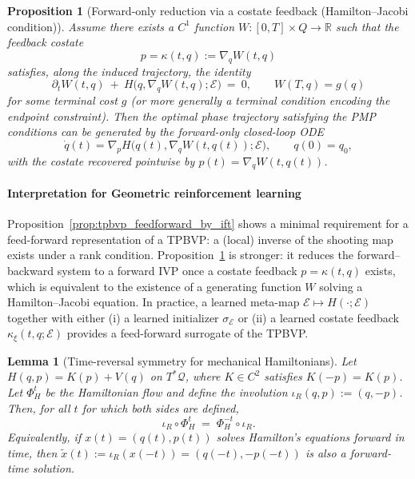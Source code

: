 \documentclass{article} %
\newtheorem{lemma}[theorem]{Lemma}         %
\newtheorem{proposition}[theorem]{Proposition}
\begin{document}
\begin{proposition}[Forward-only reduction via a costate feedback (Hamilton--Jacobi condition)]
\label{prop:tpbvp_forward_only_hj}
Assume there exists a $C^1$ function $W:[0,T]\times Q\to\mathbb R$ such that the \emph{feedback costate}
\[
p=\kappa(t,q):=\nabla_q W(t,q)
\]
satisfies, along the induced trajectory, the identity
\begin{equation}
\label{eq:hj_identity}
\partial_t W(t,q)\ +\ H\big(q,\nabla_q W(t,q);\mathcal E\big)\ =\ 0,
\qquad
W(T,q)=g(q)
\end{equation}
for some terminal cost $g$ (or more generally a terminal condition encoding the endpoint constraint).
Then the optimal phase trajectory satisfying the PMP conditions can be generated by the \emph{forward-only} closed-loop ODE
\[
\dot q(t)=\nabla_p H\big(q(t),\nabla_q W(t,q(t));\mathcal E\big),\qquad q(0)=q_0,
\]
with the costate recovered pointwise by $p(t)=\nabla_q W(t,q(t))$.
\end{proposition}

\paragraph{ Interpretation for Geometric reinforcement learning}
Proposition~\ref{prop:tpbvp_feedforward_by_ift} shows a minimal requirement for a feed-forward representation of a TPBVP:
a (local) inverse of the shooting map exists under a rank condition.
Proposition~\ref{prop:tpbvp_forward_only_hj} is stronger: it reduces the forward--backward system to a forward IVP once a costate
feedback $p=\kappa(t,q)$ exists, which is equivalent to the existence of a generating function $W$ solving a Hamilton--Jacobi equation.
In practice, a learned meta-map $\mathcal E\mapsto H(\cdot;\mathcal E)$ together with either (i) a learned initializer
$\sigma_{\mathcal E}$ or (ii) a learned costate feedback $\kappa_\xi(t,q;\mathcal E)$ provides a feed-forward surrogate of the TPBVP.

\begin{lemma}[Time-reversal symmetry for mechanical Hamiltonians]
\label{lem:mech_time_reversal}
Let $H(q,p)=K(p)+V(q)$ on $T^{*}\mathcal{Q}$, where $K\in C^2$ satisfies $K(-p)=K(p)$. Let $\Phi_H^t$ be the Hamiltonian flow and define the involution $\iota_R(q,p):=(q,-p)$.
Then, for all $t$ for which both sides are defined,
\[
\iota_R\circ \Phi_H^{t} \;=\; \Phi_H^{-t}\circ \iota_R.
\]
Equivalently, if $x(t)=(q(t),p(t))$ solves Hamilton's equations forward in time, then $\tilde x(t):=\iota_R(x(-t))=(q(-t),-p(-t))$ is also a forward-time solution.
\end{lemma}
\end{document}
